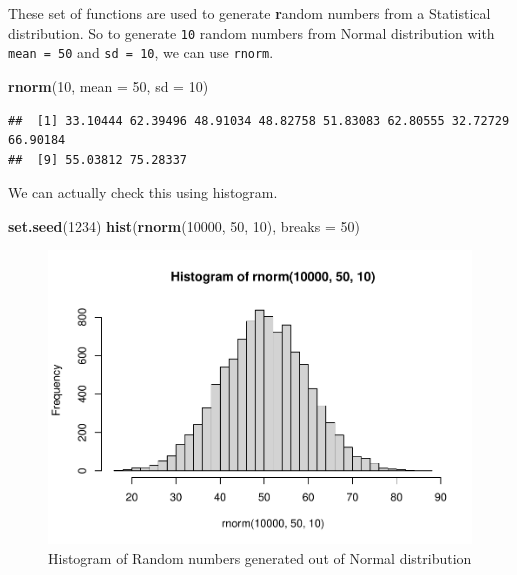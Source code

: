 \documentclass[
]{book}
\newenvironment{Shaded}{\begin{snugshade}}{\end{snugshade}}
\newcommand{\AttributeTok}[1]{\textcolor[rgb]{0.13,0.29,0.53}{#1}}
\newcommand{\DecValTok}[1]{\textcolor[rgb]{0.00,0.00,0.81}{#1}}
\newcommand{\FunctionTok}[1]{\textcolor[rgb]{0.13,0.29,0.53}{\textbf{#1}}}
\newcommand{\NormalTok}[1]{#1}
\begin{document}
These set of functions are used to generate \textbf{r}andom numbers from a Statistical distribution. So to generate \texttt{10} random numbers from Normal distribution with \texttt{mean\ =\ 50} and \texttt{sd\ =\ 10}, we can use \texttt{rnorm}.

\begin{Shaded}
\begin{Highlighting}[]
\FunctionTok{rnorm}\NormalTok{(}\DecValTok{10}\NormalTok{, }\AttributeTok{mean =} \DecValTok{50}\NormalTok{, }\AttributeTok{sd =} \DecValTok{10}\NormalTok{)}
\end{Highlighting}
\end{Shaded}

\begin{verbatim}
##  [1] 33.10444 62.39496 48.91034 48.82758 51.83083 62.80555 32.72729 66.90184
##  [9] 55.03812 75.28337
\end{verbatim}

We can actually check this using histogram.

\begin{Shaded}
\begin{Highlighting}[]
\FunctionTok{set.seed}\NormalTok{(}\DecValTok{1234}\NormalTok{)}
\FunctionTok{hist}\NormalTok{(}\FunctionTok{rnorm}\NormalTok{(}\DecValTok{10000}\NormalTok{, }\DecValTok{50}\NormalTok{, }\DecValTok{10}\NormalTok{), }\AttributeTok{breaks =} \DecValTok{50}\NormalTok{)}
\end{Highlighting}
\end{Shaded}

\begin{figure}

{\centering \includegraphics[width=0.75\linewidth]{DauR_files/figure-latex/unnamed-chunk-329-1} 

}

\caption{Histogram of Random numbers generated out of Normal distribution}\label{fig:unnamed-chunk-329}
\end{figure}
\end{document}
